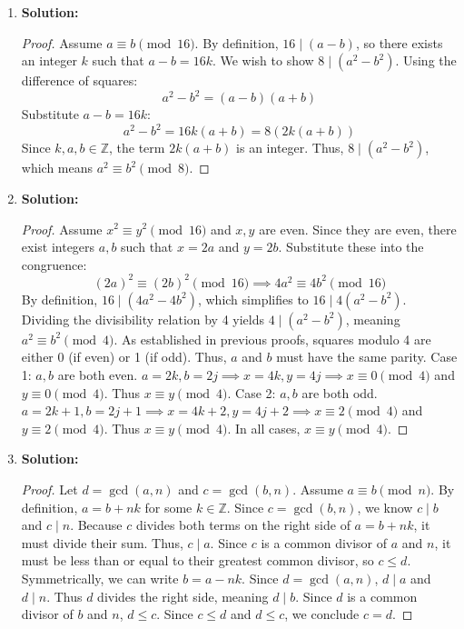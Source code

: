 \documentclass{article}
\begin{document}
\begin{enumerate}
    \item \textbf{Solution:}
    \begin{proof}
        Assume $a \equiv b \pmod{16}$. By definition, $16 \mid (a - b)$, so there exists an integer $k$ such that $a - b = 16k$. We wish to show $8 \mid (a^2 - b^2)$. Using the difference of squares:
        \[ a^2 - b^2 = (a - b)(a + b) \]
        Substitute $a - b = 16k$:
        \[ a^2 - b^2 = 16k(a + b) = 8(2k(a + b)) \]
        Since $k, a, b \in \mathbb{Z}$, the term $2k(a + b)$ is an integer. Thus, $8 \mid (a^2 - b^2)$, which means $a^2 \equiv b^2 \pmod 8$.
    \end{proof}

    \item \textbf{Solution:}
    \begin{proof}
        Assume $x^2 \equiv y^2 \pmod{16}$ and $x, y$ are even. Since they are even, there exist integers $a, b$ such that $x = 2a$ and $y = 2b$. Substitute these into the congruence:
        \[ (2a)^2 \equiv (2b)^2 \pmod{16} \implies 4a^2 \equiv 4b^2 \pmod{16} \]
        By definition, $16 \mid (4a^2 - 4b^2)$, which simplifies to $16 \mid 4(a^2 - b^2)$. Dividing the divisibility relation by 4 yields $4 \mid (a^2 - b^2)$, meaning $a^2 \equiv b^2 \pmod 4$. 
        As established in previous proofs, squares modulo 4 are either 0 (if even) or 1 (if odd). Thus, $a$ and $b$ must have the same parity. 
        Case 1: $a, b$ are both even. $a=2k, b=2j \implies x=4k, y=4j \implies x \equiv 0 \pmod 4$ and $y \equiv 0 \pmod 4$. Thus $x \equiv y \pmod 4$.
        Case 2: $a, b$ are both odd. $a=2k+1, b=2j+1 \implies x=4k+2, y=4j+2 \implies x \equiv 2 \pmod 4$ and $y \equiv 2 \pmod 4$. Thus $x \equiv y \pmod 4$.
        In all cases, $x \equiv y \pmod 4$.
    \end{proof}

    \item \textbf{Solution:}
    \begin{proof}
        Let $d = \gcd(a, n)$ and $c = \gcd(b, n)$. Assume $a \equiv b \pmod n$. By definition, $a = b + nk$ for some $k \in \mathbb{Z}$. 
        Since $c = \gcd(b, n)$, we know $c \mid b$ and $c \mid n$. Because $c$ divides both terms on the right side of $a = b + nk$, it must divide their sum. Thus, $c \mid a$. Since $c$ is a common divisor of $a$ and $n$, it must be less than or equal to their greatest common divisor, so $c \le d$.
        Symmetrically, we can write $b = a - nk$. Since $d = \gcd(a, n)$, $d \mid a$ and $d \mid n$. Thus $d$ divides the right side, meaning $d \mid b$. Since $d$ is a common divisor of $b$ and $n$, $d \le c$.
        Since $c \le d$ and $d \le c$, we conclude $c = d$.
    \end{proof}


\end{enumerate}
\end{document}
